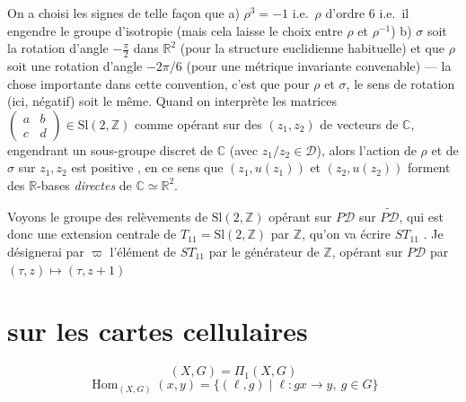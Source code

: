 \documentclass[11pt,a4paper]{article}
\begin{document}
On a choisi les signes de telle façon que a) $\rho^{3} = -1$ i.e.\ $\rho$ d'ordre $6$ i.e.\ il engendre le groupe d'isotropie  (mais cela laisse le choix entre $\rho$ et $\rho^{-1}$) b) $\sigma$ soit la rotation d'angle $-\frac{\pi}{2}$ dans $\mathbb{R}^{2}$ (pour la structure euclidienne habituelle) et que $\rho$ soit une rotation d'angle $-2\pi/6$ (pour une métrique invariante convenable) --- la chose importante dans cette convention, c'est que pour $\rho$ et $\sigma$, le sens de rotation (ici, négatif) soit le même. Quand on interprète  les matrices $\begin{pmatrix} a & b \\ c & d \end{pmatrix} \in \mathrm{Sl}(2, \mathbb{Z})$ comme opérant sur des \struck{\ill{}}  $(z_{1}, z_{2})$ de vecteurs de $\mathbb{C}$, engendrant un sous-groupe discret de $\mathbb{C}$ (avec $z_{1}/z_{2} \in \mathcal{D}$), alors l'action de $\rho$ et de $\sigma$ sur $z_{1}, z_{2}$ est \og positive \fg, en ce sens que $(z_{1}, u(z_{1}))$ et $(z_{2}, u(z_{2}))$ forment des $\mathbb{R}$-bases \emph{directes} de $\mathbb{C} \simeq \mathbb{R}^{2}$.

Voyons le groupe des relèvements de $\mathrm{Sl}(2, \mathbb{Z})$ opérant sur $P\mathcal{D}$ sur $\widetilde{P\mathcal{D}}$, qui est donc une extension centrale de $T_{11} = \mathrm{Sl}(2, \mathbb{Z})$ par $\mathbb{Z}$, \struck{\ill{}} \add{\uncertain{\ill{}}}  qu'on va écrire $ST_{11}$ . Je désignerai par \struck{\ill{}} $\varpi$ l'élément de  $ST_{11}$  par le générateur de $\mathbb{Z}$, opérant sur $P\mathcal{D}$ par $(\tau, z) \mapsto (\tau, z + 1)$

\section{ sur les cartes cellulaires}

\[
  (X, G) = \Pi_{1}(X, G)
\]
\[
  \mathop{\mathrm{Hom}}_{(X,G)}(x, y) = \{(\ell, g) \mid \ell : gx \to y,\ g \in G\}
\]
\end{document}
